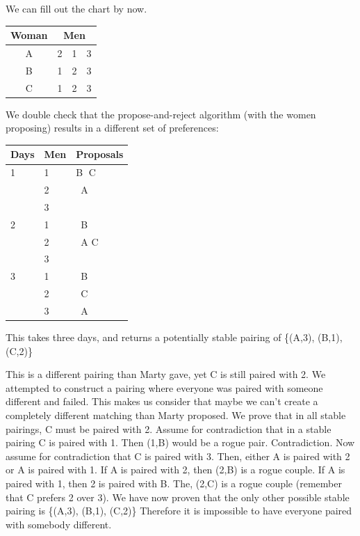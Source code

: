 \documentclass[11pt]{article}
\begin{document}
\begin{qunlist}
\begin{itemize}
{We can fill out the chart by now.

\begin{center}
\begin{tabular}{|c|ccc|}\hline 
Woman&\multicolumn{3}{|c|}{Men}\\\hline 
A&2&1&3\\\hline 
B&1&2&3\\\hline 
C&1&2&3\\\hline
\end{tabular}
\end{center}

We double check that the propose-and-reject algorithm (with the women proposing) 
results in a different set of preferences:

\begin{center}
    \begin{tabular}{| l | l | l |}
    \hline
    Days & Men & Proposals \\ \hline
     1 & 1 & \textcircled{B} C \\ 
       & 2 & \ A \\ 
       & 3 &  \\ \hline
     2 & 1 & \ B \\ 
       & 2 &   \ A \textcircled{C} \\ 
       & 3 &  \\ \hline
     3 & 1 & \ B \\ 
       & 2 & \ C\\ 
       & 3 & \ A \\ \hline
    \end{tabular}
\end{center}
This takes three days, and returns a potentially stable pairing of \{(A,3), (B,1), (C,2)\}

This is a different pairing than Marty gave, yet C is still paired with 2. We attempted to construct a pairing where everyone was paired with someone different and failed. This makes us consider that maybe we can't create a completely different matching than Marty proposed. We prove that in all stable pairings, C must be paired with 2. 
Assume for contradiction that in a stable pairing C is paired with 1. 
Then (1,B) would be a rogue pair. Contradiction. 
Now assume for contradiction that C is paired with 3. Then, either A is paired with 2 or A is paired with 1. 
If A is paired with 2, then (2,B) is a rogue couple. If A is paired with 1, then 2 is paired with B. 
The, (2,C) is a rogue couple (remember that C prefers 2 over 3).
We have now proven that the only other possible stable pairing is \{(A,3), (B,1), (C,2)\} Therefore it is impossible to have everyone paired with somebody different.

}
\end{itemize}
\end{qunlist}
\end{document}
